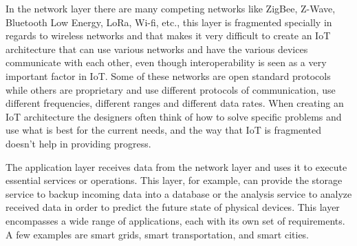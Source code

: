 \documentclass[conference]{IEEEtran}
\begin{document}
In the network layer there are many competing networks like ZigBee, Z-Wave,
Bluetooth Low Energy, LoRa, Wi-fi, etc., this layer is fragmented specially
in regards to wireless networks and that makes it very difficult to create
an IoT architecture that can use various networks and have the various
devices communicate with each other, even though interoperability is seen
as a very important factor in IoT. Some of these networks are open standard
protocols while others are proprietary and use different protocols of communication,
use different frequencies, different ranges and different data rates. When
creating an IoT architecture the designers often think of how to solve
specific problems and use what is best for the current needs, and the way
that IoT is fragmented doesn't help in providing progress.

The application layer receives data from the network layer and uses it to
execute essential services or operations. This layer, for example, can provide
the storage service to backup incoming data into a database or the analysis
service to analyze received data in order to predict the future state of
physical devices. This layer encompasses a wide range of applications,
each with its own set of requirements. A few examples are smart grids,
smart transportation, and smart cities.


\end{document}
